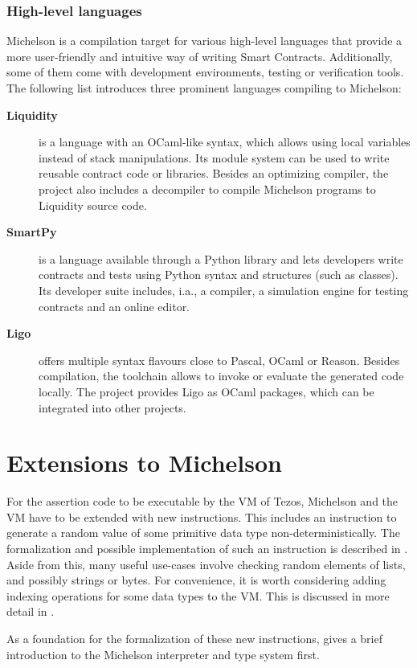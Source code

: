 \subsubsection{High-level languages}
Michelson is a compilation target for various high-level languages that provide a more user-friendly and intuitive way of writing Smart Contracts. Additionally, some of them come with development environments, testing or verification tools. The following list introduces three prominent languages compiling to Michelson:
\begin{description}
\item[\textbf{Liquidity}] \cite{liquidity} is a language with an OCaml-like syntax, which allows using local variables instead of stack manipulations. Its module system can be used to write reusable contract code or libraries. Besides an optimizing compiler, the project also includes a decompiler to compile Michelson programs to Liquidity source code.
\item[\textbf{SmartPy}] \cite{smartpy} is a language available through a Python library and lets developers write contracts and tests using Python syntax and structures (such as classes). Its developer suite includes, i.a., a compiler, a simulation engine for testing contracts and an online editor.
\item [\textbf{Ligo}] \cite{ligo} offers multiple syntax flavours close to Pascal, OCaml or Reason. Besides compilation, the toolchain allows to invoke or evaluate the generated code locally. The project provides Ligo as OCaml packages, which can be integrated into other projects.
\end{description}

\section{Extensions to Michelson}\label{sec:ext_michelson}
For the assertion code to be executable by the VM of Tezos, Michelson and the VM have to be extended with new instructions. This includes an instruction to generate a random value of some primitive data type non-deterministically. The formalization and possible implementation of such an instruction is described in . Aside from this, many useful use-cases involve checking random elements of lists, and possibly strings or bytes. For convenience, it is worth considering adding indexing operations for some data types to the VM. This is discussed in more detail in .

As a foundation for the formalization of these new instructions,  gives a brief introduction to the Michelson interpreter and type system first.  

